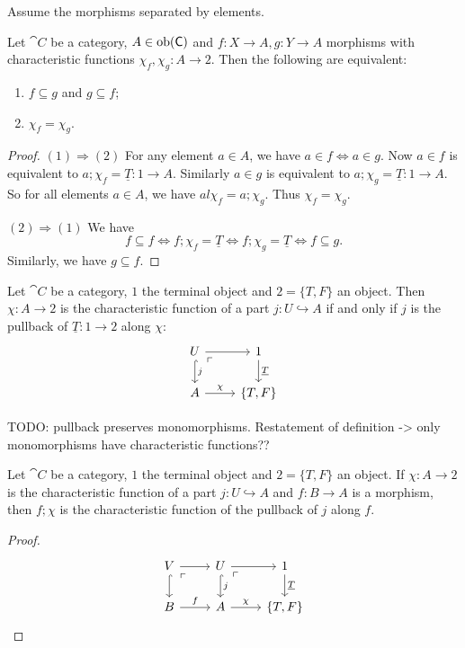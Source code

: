 Assume the morphisms separated by elements.
\begin{proposition}
Let $\cat{C}$ be a category, $A\in\operatorname{ob}(\mathsf{C})$ and $f: X\to A,g: Y\to A$ morphisms with characteristic functions $\chi_f, \chi_g: A\to 2$. Then the following are equivalent:
\begin{enumerate}
\item $f \subseteq g$ and $g \subseteq f$;
\item $\chi_f = \chi_g$.
\end{enumerate}
\end{proposition}
\begin{proof}
$(1) \Rightarrow (2)$ For any element $a \in A$, we have $a \in f \iff a\in g$. Now $a\in f$ is equivalent to $a; \chi_f = \underline{T}:1\to A$. Similarly $a\in g$ is equivalent to $a; \chi_g = \underline{T}:1\to A$. So for all elements $a\in A$, we have $al \chi_f = a; \chi_g$. Thus $\chi_f = \chi_g$.

$(2) \Rightarrow (1)$ We have
\[ f \subseteq f \iff f;\chi_f = \underline{T} \iff f;\chi_g = \underline{T} \iff f \subseteq g. \]
Similarly, we have $g \subseteq f$.
\end{proof}

\begin{lemma}
Let $\cat{C}$ be a category, $1$ the terminal object and $2 = \{T,F\}$ an object. Then $\chi: A\to 2$ is the characteristic function of a part $j: U\hookrightarrow A$ \textup{if and only if} $j$ is the pullback of $\underline{T}: 1\to 2$ along $\chi$:
\[ \begin{tikzcd}
U \arrow[r] \arrow[d, hook, "j"] \pbCorner & 1 \arrow[d, "\underline{T}"] \\
A \arrow[r, "\chi"] & \{T,F\}
\end{tikzcd} \]
\end{lemma}
TODO: pullback preserves monomorphisms. Restatement of definition -> only monomorphisms have characteristic functions??

\begin{proposition}
Let $\cat{C}$ be a category, $1$ the terminal object and $2 = \{T,F\}$ an object. If $\chi: A\to 2$ is the characteristic function of a part $j: U\hookrightarrow A$ and $f: B\to A$ is a morphism, then $f;\chi$ is the characteristic function of the pullback of $j$ along $f$.
\end{proposition}
\begin{proof}
\[ \begin{tikzcd}
V \pbCorner \rar \arrow[d, hook] & U \arrow[r] \arrow[d, hook, "j"] \pbCorner & 1 \arrow[d, "\underline{T}"] \\
B \arrow[r, "f"] & A \arrow[r, "\chi"] & \{T,F\}
\end{tikzcd} \]
\end{proof}

